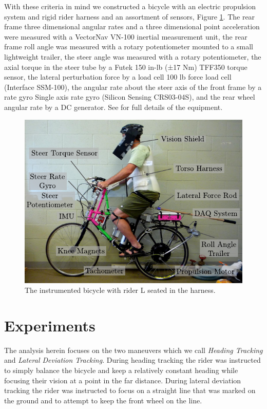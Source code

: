 \documentclass[a4paper]{article}
\begin{document}
With these criteria in mind we constructed a bicycle with an electric
propulsion system and rigid rider harness and an assortment of sensors, Figure
\ref{fig:instrumented-bicycle}. The rear frame three dimensional angular rates
and a three dimensional point acceleration were measured with a VectorNav
VN-100 inertial measurement unit, the rear frame roll angle was measured with a
rotary potentiometer mounted to a small lightweight trailer, the steer angle
was measured with a rotary potentiometer, the axial torque in the steer tube by
a Futek 150 in-lb (±17 Nm) TFF350 torque sensor, the lateral perturbation force
by a load cell 100 lb force load cell (Interface SSM-100), the angular rate
about the steer axis of the front frame by a rate gyro Single axis rate gyro
(Silicon Sensing CRS03-04S), and the rear wheel angular rate by a DC generator.
See \cite{Moore2012} for full details of the equipment.

\begin{figure}
  \label{fig:instrumented-bicycle}
  \includegraphics[width=5in]{figures/instrumented-bicycle.pdf}
  \caption{The instrumented bicycle with rider L seated in the harness.}
\end{figure}

\section{Experiments}

The analysis herein focuses on the two maneuvers which we call \emph{Heading
Tracking} and \emph{Lateral Deviation Tracking}. During heading tracking the
rider was instructed to simply balance the bicycle and keep a relatively
constant heading while focusing their vision at a point in the far distance.
During lateral deviation tracking the rider was instructed to focus on a
straight line that was marked on the ground and to attempt to keep the front
wheel on the line.
\end{document}
